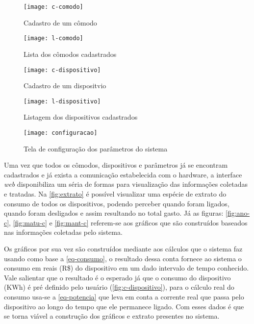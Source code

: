\begin{figure}[h!]
	\texttt{[image: c-comodo]}
	\centering
	\caption[Cadastro de um cômodo]{Cadastro de um cômodo}
	\label{fig:c-comodo}
\end{figure}
\FloatBarrier

\begin{figure}[h!]
	\texttt{[image: l-comodo]}
	\centering
	\caption[Lista dos cômodos cadastrados]{Lista dos cômodos cadastrados}
	\label{fig:l-comodo}
\end{figure}
\FloatBarrier

\begin{figure}[h!]
	\texttt{[image: c-dispositivo]}
	\centering
	\caption[Cadastro de um dispositivo]{Cadastro de um dispositvio}
	\label{fig:c-dispositivo} 
\end{figure}
\FloatBarrier

\begin{figure}[h!]
	\texttt{[image: l-dispositivo]}
	\centering
	\caption[Listagem dos dispositivos cadastrados]{Listagem dos dispositivos cadastrados}
	\label{fig:l-dispositivo} 
\end{figure}
\FloatBarrier

\begin{figure}[h!]
	\texttt{[image: configuracao]}
	\centering
	\caption[Tela de configuração dos parâmetros do sistema]{Tela de configuração dos parâmetros do sistema}
	\label{fig:configuracao-ft} 
\end{figure}
\FloatBarrier

Uma vez que todos os cômodos, dispositivos e parâmetros já se encontram cadastrados e já exista a comunicação estabelecida com o hardware, a interface
\textit{web} disponibiliza um séria de formas para visualização das informações coletadas e tratadas. Na \autoref{fig:extrato} é possível visualizar
uma espécie de extrato do consumo de todos os dispositivos, podendo perceber quando foram ligados, quando foram desligados e assim resultando no total gasto.
Já as figuras: \ref{fig:ano-c}, \ref{fig:matu-c} e \ref{fig:mant-c} referem-se aos gráficos que são construídos baseados nas informações coletadas pelo sistema.

Os gráficos por sua vez são construídos mediante aos cálculos que o sistema faz usando como base a \autoref{eq-consumo}, o resultado dessa conta
fornece ao sistema o consumo em reais (R\$) do dispositivo em um dado intervalo de tempo conhecido. Vale salientar que o resultado é o esperado já que o consumo
do dispositivo (KWh) é pré definido pelo usuário (\autoref{fig:c-dispositivo}), para o cálculo real do consumo usa-se a \autoref{eq-potencia} que leva em conta a corrente real que passa
pelo dispositivo ao longo do tempo que ele permanece ligado. Com esses dados é que se torna viável a construção dos gráficos e extrato presentes no sistema.


